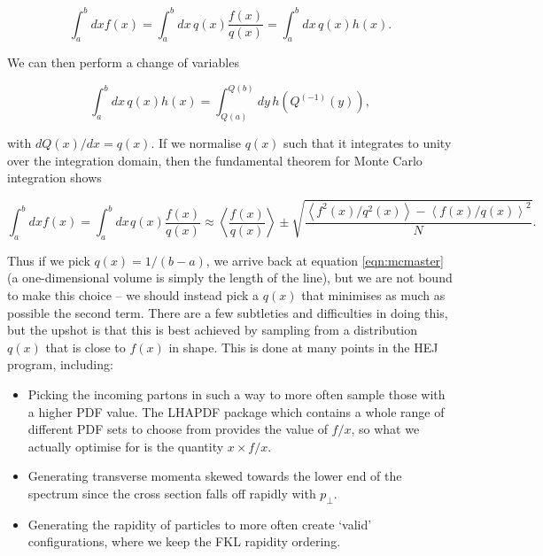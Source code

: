 \begin{equation}
\int_a^b dx f(x) = \int_a^b dx \hspace{2pt} q(x) \frac{f(x)}{q(x)} = \int_a^b dx \hspace{2pt} q(x) h(x).
\end{equation}

We can then perform a change of variables

\begin{equation}
\int_a^b dx \hspace{2pt} q(x) h(x) = \int_{Q(a)}^{Q(b)} dy \hspace{2pt} h \left(Q^{(-1)}(y) \right),
\end{equation}

with $dQ(x)/dx = q(x)$. If we normalise $q(x)$ such that it integrates to unity over the integration domain, then the fundamental theorem for Monte Carlo integration shows

\begin{equation}
\int_a^b dx f(x) = \int_a^b dx \hspace{1pt} q(x) \frac{f(x)}{q(x)} \approx \left< \frac{f(x)}{q(x)} \right> \pm \sqrt{\frac{\left<f^2(x)/q^2(x)\right> - \left<f(x)/q(x) \right>^2}{N}}.
\end{equation} 

Thus if we pick $q(x) = 1/(b-a)$, we arrive back at equation \ref{eqn:mcmaster} (a one-dimensional volume is simply the length of the line), but we are not bound to make this choice -- we should instead pick a $q(x)$ that minimises as much as possible the second term. There are a few subtleties and difficulties in doing this, but the upshot is that this is best achieved by sampling from a distribution $q(x)$ that is close to $f(x)$ in shape. This is done at many points in the HEJ program, including:

\begin{itemize} 
\item{Picking the incoming partons in such a way to more often sample those with a higher PDF value. The LHAPDF package \cite{Buckley2014} which contains a whole range of different PDF sets to choose from provides the value of $f/x$, so what we actually optimise for is the quantity $x \times f/x$.}
\item{Generating transverse momenta skewed towards the lower end of the spectrum since the cross section falls off rapidly with $p_\perp$.}
\item{Generating the rapidity of particles to more often create `valid' configurations, where we keep the FKL rapidity ordering.}
\end{itemize}

